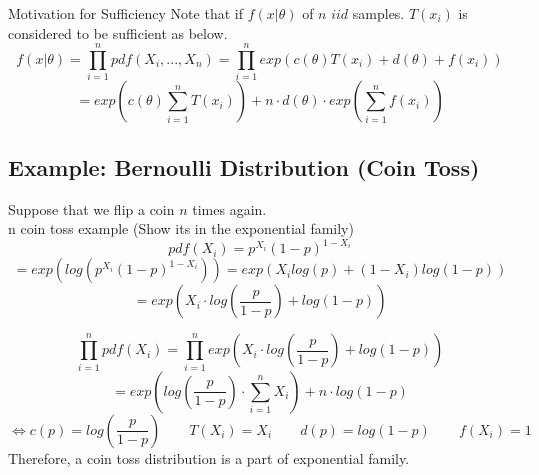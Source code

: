 \documentclass[12pt]{article}
\begin{document}
\begin{section}{Motivation for Sufficiency}
Note that if $f(x|\theta)$ of $n$ $iid$ samples. $T(x_i)$ is considered to be sufficient as below. 
$$f(x|\theta) = \prod_{i=1}^n pdf(X_i,...,X_n) = \prod_{i=1}^n exp(c(\theta)T(x_i)+ d(\theta) + f(x_i))$$ $$= exp(c(\theta)\sum_{i=1}^n T(x_i)) + n\cdot d(\theta)\cdot exp(\sum_{i=1}^n f(x_i))$$

\subsection{Example: Bernoulli Distribution (Coin Toss)}
Suppose that we flip a coin $n$ times again.
\\n coin toss example (Show its in the exponential family)\\
$$pdf(X_i) = p^{X_i}(1-p)^{1-X_i}$$ 
$$= exp(log(p^{X_i}(1-p)^{1-X_i})) = exp(X_i log(p) + (1-X_i)log(1-p))$$ 
$$=exp(X_i \cdot log(\frac{p}{1-p}) + log(1-p))$$

$$\prod_{i=1}^n pdf(X_i) = \prod_{i=1}^n exp(X_i\cdot log(\frac{p}{1-p}) + log(1-p))$$ 
$$= exp(log(\frac{p}{1-p}) \cdot \sum_{i=1}^n X_i ) + n \cdot log(1-p)$$
$$\Leftrightarrow c(p)=log(\frac{p}{1-p}) \qquad T(X_i)=X_i \qquad d(p)=log(1-p) \qquad f(X_i)=1 $$
Therefore, a coin toss distribution is a part of exponential family.







\end{section}
\end{document}
